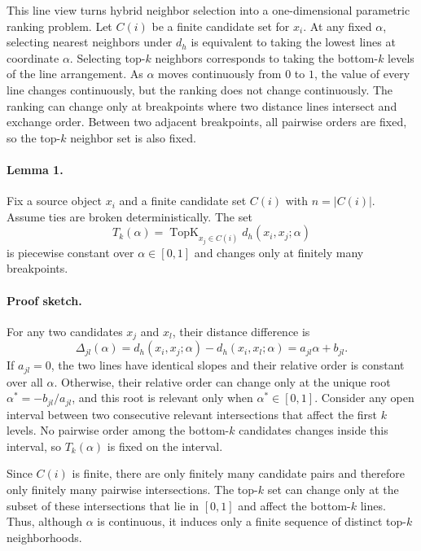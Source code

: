 This line view turns hybrid neighbor selection into a one-dimensional parametric ranking problem. Let $C(i)$ be a finite candidate set for $x_i$. At any fixed $\alpha$, selecting nearest neighbors under $d_h$ is equivalent to taking the lowest lines at coordinate $\alpha$. Selecting top-$k$ neighbors corresponds to taking the bottom-$k$ levels of the line arrangement. As $\alpha$ moves continuously from $0$ to $1$, the value of every line changes continuously, but the ranking does not change continuously. The ranking can change only at breakpoints where two distance lines intersect and exchange order. Between two adjacent breakpoints, all pairwise orders are fixed, so the top-$k$ neighbor set is also fixed.

\paragraph{Lemma 1.}
Fix a source object $x_i$ and a finite candidate set $C(i)$ with $n=|C(i)|$. Assume ties are broken deterministically. The set
\begin{equation}
    T_k(\alpha)=\operatorname{TopK}_{x_j\in C(i)}d_h(x_i,x_j;\alpha)
\end{equation}
is piecewise constant over $\alpha\in[0,1]$ and changes only at finitely many breakpoints.

\paragraph{Proof sketch.}
For any two candidates $x_j$ and $x_l$, their distance difference is
\begin{equation}
    \Delta_{jl}(\alpha)
    =d_h(x_i,x_j;\alpha)-d_h(x_i,x_l;\alpha)
    =a_{jl}\alpha+b_{jl}.
\end{equation}
If $a_{jl}=0$, the two lines have identical slopes and their relative order is constant over all $\alpha$. Otherwise, their relative order can change only at the unique root $\alpha^*=-b_{jl}/a_{jl}$, and this root is relevant only when $\alpha^*\in[0,1]$. Consider any open interval between two consecutive relevant intersections that affect the first $k$ levels. No pairwise order among the bottom-$k$ candidates changes inside this interval, so $T_k(\alpha)$ is fixed on the interval.

Since $C(i)$ is finite, there are only finitely many candidate pairs and therefore only finitely many pairwise intersections. The top-$k$ set can change only at the subset of these intersections that lie in $[0,1]$ and affect the bottom-$k$ lines. Thus, although $\alpha$ is continuous, it induces only a finite sequence of distinct top-$k$ neighborhoods.

